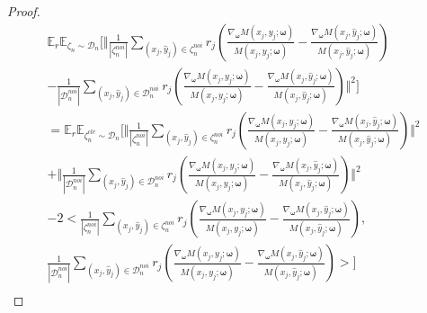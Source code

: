 \begin{proof}
\begin{multline}\label{eq:proof-b-v3}
    \mathbb{E}_{r}\mathbb{E}_{\zeta_n\sim \mathcal{D}_n}\Biggl[\Vert\frac{1}{|\zeta_n^{noi}|}\sum_{\left(x_j,\hat{y}_j\right)\in \zeta_n^{noi}}r_j\left(\frac{\nabla_{\boldsymbol{\omega}} M\left(x_j,y_j;\boldsymbol{\omega}\right)}{M\left(x_j,y_j;\boldsymbol{\omega}\right)} -\frac{\nabla_{\boldsymbol{\omega}} M\left(x_j,\hat{y}_j;\boldsymbol{\omega}\right)}{M\left(x_j,\hat{y}_j;\boldsymbol{\omega}\right)}\right)\\
    -\frac{1}{|\mathcal{D}_n^{noi}|}\sum_{\left(x_j,\hat{y}_j\right)\in \mathcal{D}_n^{noi}}r_j\left(\frac{\nabla_{\boldsymbol{\omega}} M\left(x_j,y_j;\boldsymbol{\omega}\right)}{M\left(x_j,y_j;\boldsymbol{\omega}\right)} -\frac{\nabla_{\boldsymbol{\omega}} M\left(x_j,\hat{y}_j;\boldsymbol{\omega}\right)}{M\left(x_j,\hat{y}_j;\boldsymbol{\omega}\right)}\right)\Vert^2\Biggl]\\
    =\mathbb{E}_{r}\mathbb{E}_{\zeta_n^{cle}\sim \mathcal{D}_n}\Biggl[\Vert\frac{1}{|\zeta_n^{noi}|}\sum_{\left(x_j,\hat{y}_j\right)\in \zeta_n^{noi}}r_j\left(\frac{\nabla_{\boldsymbol{\omega}} M\left(x_j,y_j;\boldsymbol{\omega}\right)}{M\left(x_j,y_j;\boldsymbol{\omega}\right)} -\frac{\nabla_{\boldsymbol{\omega}} M\left(x_j,\hat{y}_j;\boldsymbol{\omega}\right)}{M\left(x_j,\hat{y}_j;\boldsymbol{\omega}\right)}\right)\Vert^2\\
    +\Vert\frac{1}{|\mathcal{D}_n^{noi}|}\sum_{\left(x_j,\hat{y}_j\right)\in \mathcal{D}_n^{noi}}r_j\left(\frac{\nabla_{\boldsymbol{\omega}} M\left(x_j,y_j;\boldsymbol{\omega}\right)}{M\left(x_j,y_j;\boldsymbol{\omega}\right)} -\frac{\nabla_{\boldsymbol{\omega}} M\left(x_j,\hat{y}_j;\boldsymbol{\omega}\right)}{M\left(x_j,\hat{y}_j;\boldsymbol{\omega}\right)}\right)\Vert^2\\
    -2<\frac{1}{|\zeta_n^{noi}|}\sum_{\left(x_j,\hat{y}_j\right)\in \zeta_n^{noi}}r_j\left(\frac{\nabla_{\boldsymbol{\omega}} M\left(x_j,y_j;\boldsymbol{\omega}\right)}{M\left(x_j,y_j;\boldsymbol{\omega}\right)} -\frac{\nabla_{\boldsymbol{\omega}} M\left(x_j,\hat{y}_j;\boldsymbol{\omega}\right)}{M\left(x_j,\hat{y}_j;\boldsymbol{\omega}\right)}\right),\\
    \frac{1}{|\mathcal{D}_n^{noi}|}\sum_{\left(x_j,\hat{y}_j\right)\in \mathcal{D}_n^{noi}}r_j\left(\frac{\nabla_{\boldsymbol{\omega}} M\left(x_j,y_j;\boldsymbol{\omega}\right)}{M\left(x_j,y_j;\boldsymbol{\omega}\right)} -\frac{\nabla_{\boldsymbol{\omega}} M\left(x_j,\hat{y}_j;\boldsymbol{\omega}\right)}{M\left(x_j,\hat{y}_j;\boldsymbol{\omega}\right)}\right)>\Biggl]\\

\end{multline}
\end{proof}

